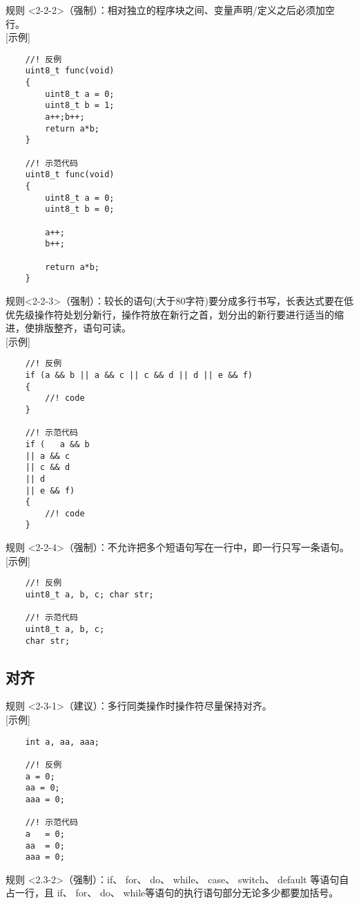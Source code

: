 \documentclass[UTF8,a4paper,12pt]{article}
\begin{document}
	规则 <2-2-2>（强制）：相对独立的程序块之间、变量声明/定义之后必须加空行。\\
	
	[示例]\\
	\begin{lstlisting}
	//! 反例
	uint8_t func(void)
	{
		uint8_t a = 0;
		uint8_t b = 1;
		a++;b++;
		return a*b;
	}
	
	//! 示范代码
	uint8_t func(void)
	{
		uint8_t a = 0;
		uint8_t b = 0;
		
		a++;
		b++;
		
		return a*b;
	}
	\end{lstlisting}
	
	规则<2-2-3>（强制）：较长的语句(大于80字符)要分成多行书写，长表达式要在低优先级操作符处划分新行，操作符放在新行之首，划分出的新行要进行适当的缩进，使排版整齐，语句可读。\\
	
	[示例]\\
	\begin{lstlisting}
	//! 反例
	if (a && b || a && c || c && d || d || e && f)
	{
		//! code
	}
	
	//! 示范代码
	if (   a && b 
	|| a && c 
	|| c && d 
	|| d 
	|| e && f)
	{
		//! code
	}
	\end{lstlisting}

	规则 <2-2-4>（强制）：不允许把多个短语句写在一行中，即一行只写一条语句。\\
	
	[示例]\\
	\begin{lstlisting}
	//! 反例
	uint8_t a, b, c; char str;
	
	//! 示范代码
	uint8_t a, b, c;
	char str;
	\end{lstlisting}

	\subsection{对齐}
	规则 <2-3-1>（建议）：多行同类操作时操作符尽量保持对齐。\\
	
	[示例]\\
	\begin{lstlisting}
	int a, aa, aaa;
	
	//! 反例
	a = 0;
	aa = 0;
	aaa = 0;
	
	//! 示范代码
	a   = 0;
	aa  = 0;
	aaa = 0;
	\end{lstlisting}
	
	规则 <2.3-2>（强制）：if、 for、 do、 while、 case、 switch、 default 等语句自占一行，且 if、 for、 do、 while等语句的执行语句部分无论多少都要加括号{}。\\
	
\end{document}
